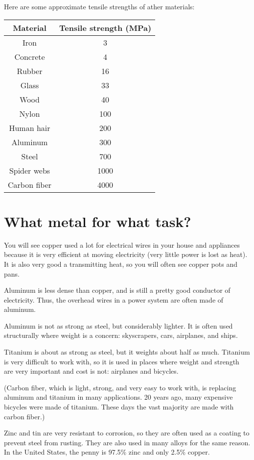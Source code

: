 Here are some approximate tensile strengths of ather materials:

\begin{tabular}{c|c}
  Material & Tensile strength (MPa) \\
  \hline
  Iron & 3 \\
  Concrete & 4 \\
  Rubber & 16 \\
  Glass & 33 \\
  Wood & 40 \\
  Nylon & 100 \\
  Human hair & 200 \\
  Aluminum  & 300 \\
  Steel & 700 \\
  Spider webs & 1000 \\
  Carbon fiber & 4000
\end{tabular}

\section{What metal for what task?}

You will see copper used a lot for electrical wires in your house and
appliances because it is very efficient at moving electricity (very
little power is lost as heat). It is also very good a transmitting
heat, so you will often see copper pots and pans.

Aluminum is less dense than copper, and is still a pretty good
conductor of electricity. Thus, the overhead wires in a power system
are often made of aluminum.

Aluminum is not as strong as steel, but considerably lighter. It is
often used structurally where weight is a concern: skyscrapers, cars,
airplanes, and ships.

Titanium is about as strong as steel, but it weights about half as
much. Titanium is very difficult to work with, so it is used in places
where weight and strength are very important and cost is not:
airplanes and bicycles.

(Carbon fiber, which is light, strong, and very easy to work with, is
replacing aluminum and titanium in many applications. 20 years ago,
many expensive bicycles were made of titanium. These days the vast
majority are made with carbon fiber.)

Zinc and tin are very resistant to corrosion, so they are often used
as a coating to prevent steel from rusting. They are also used in many
alloys for the same reason.  In the United States, the penny is 97.5\%
zinc and only 2.5\% copper.

